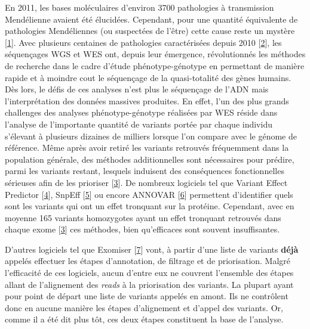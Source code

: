 \documentclass[12pt,twoside]{reedthesis}
\theoremstyle{definition}
\theoremstyle{definition}
\theoremstyle{remark}
\begin{document}
  En 2011, les bases moléculaires d'environ 3700 pathologies à
  transmission Mendélienne avaient été élucidées. Cependant, pour une
  quantité équivalente de pathologies Mendéliennes (ou suspectées de
  l'être) cette cause reste un mystère
  {[}\protect\hyperlink{ref-Amberger2011}{1}{]}. Avec plusieurs centaines
  de pathologies caractérisées depuis 2010
  {[}\protect\hyperlink{ref-Ng}{2}{]}, les séquençages WGS et WES ont,
  depuis leur émergence, révolutionnés les méthodes de recherche dans le
  cadre d'étude phénotype-génotype en permettant de manière rapide et à
  moindre cout le séquençage de la quasi-totalité des gènes humains. Dès
  lors, le défis de ces analyses n'est plus le séquençage de l'ADN mais
  l'interprétation des données massives produites. En effet, l'un des plus
  grands challenges des analyses phénotype-génotype réalisées par WES
  réside dans l'analyse de l'importante quantité de variants portée par
  chaque individu s'élevant à plusieurs dizaines de milliers lorsque l'on
  compare avec le génome de référence. Même après avoir retiré les
  variants retrouvés fréquemment dans la population générale, des méthodes
  additionnelles sont nécessaires pour prédire, parmi les variants
  restant, lesquels induisent des conséquences fonctionnelles sérieuses
  afin de les prioriser {[}\protect\hyperlink{ref-Pelak2010}{3}{]}. De
  nombreux logiciels tel que Variant Effect Predictor
  {[}\protect\hyperlink{ref-McLaren2016}{4}{]}, SnpEff
  {[}\protect\hyperlink{ref-Cingolani2012}{5}{]} ou encore ANNOVAR
  {[}\protect\hyperlink{ref-Wang2010}{6}{]} permettent d'identifier quels
  sont les variants qui ont un effet tronquant sur la protéine. Cependant,
  avec en moyenne 165 variants homozygotes ayant un effet tronquant
  retrouvés dans chaque exome {[}\protect\hyperlink{ref-Pelak2010}{3}{]}
  ces méthodes, bien qu'efficaces sont souvent insuffisantes.
  
  D'autres logiciels tel que Exomiser
  {[}\protect\hyperlink{ref-Robinson2014}{7}{]} vont, à partir d'une liste
  de variants \textbf{déjà} appelés effectuer les étapes d'annotation, de
  filtrage et de priorisation. Malgré l'efficacité de ces logiciels, aucun
  d'entre eux ne couvrent l'ensemble des étapes allant de l'alignement des
  \emph{reads} à la priorisation des variants. La plupart ayant pour point
  de départ une liste de variants appelés en amont. Ils ne contrôlent donc
  en aucune manière les étapes d'alignement et d'appel des variants. Or,
  comme il a été dit plus tôt, ces deux étapes constituent la base de
  l'analyse.
  
\end{document}
